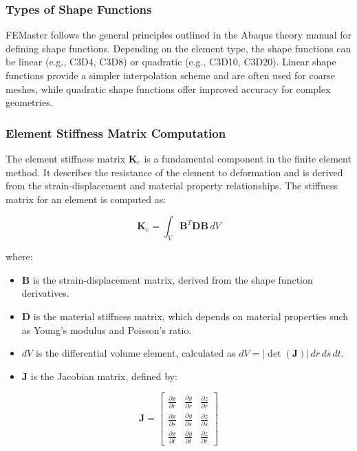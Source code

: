 \subsubsection{Types of Shape Functions}

FEMaster follows the general principles outlined in the Abaqus theory manual for defining shape functions. Depending on the element type, the shape functions can be linear (e.g., C3D4, C3D8) or quadratic (e.g., C3D10, C3D20). Linear shape functions provide a simpler interpolation scheme and are often used for coarse meshes, while quadratic shape functions offer improved accuracy for complex geometries.

\subsubsection{Element Stiffness Matrix Computation}

The element stiffness matrix \(\mathbf{K}_e\) is a fundamental component in the finite element method. It describes the resistance of the element to deformation and is derived from the strain-displacement and material property relationships. The stiffness matrix for an element is computed as:

\[
\mathbf{K}_e = \int_{V} \mathbf{B}^T \mathbf{D} \mathbf{B} \, dV
\]

where:
\begin{itemize}
    \item \( \mathbf{B} \) is the strain-displacement matrix, derived from the shape function derivatives.
    \item \( \mathbf{D} \) is the material stiffness matrix, which depends on material properties such as Young's modulus and Poisson's ratio.
    \item \( dV \) is the differential volume element, calculated as \( dV = \left| \det(\mathbf{J}) \right| \, dr \, ds \, dt \).
    \item \( \mathbf{J} \) is the Jacobian matrix, defined by:
\end{itemize}

\[
\mathbf{J} =
\begin{bmatrix}
\frac{\partial x}{\partial r} & \frac{\partial y}{\partial r} & \frac{\partial z}{\partial r} \\
\frac{\partial x}{\partial s} & \frac{\partial y}{\partial s} & \frac{\partial z}{\partial s} \\
\frac{\partial x}{\partial t} & \frac{\partial y}{\partial t} & \frac{\partial z}{\partial t}
\end{bmatrix}
\]

